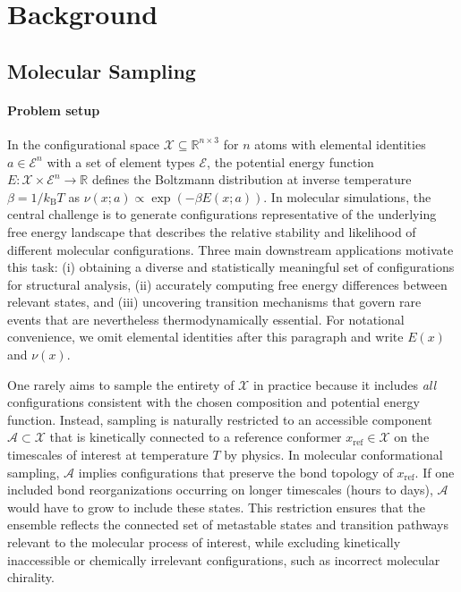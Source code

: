 \documentclass[]{fairmeta}
\theoremstyle{remark}
\begin{document}
\section{Background}

\subsection{Molecular Sampling}
\label{sec:molecular_sampling}

\paragraph{Problem setup}
In the configurational space $\mathcal{X} \subseteq \mathbb{R}^{n \times 3}$ for $n$ atoms with elemental identities $a \in \mathcal{E}^n$ with a set of element types $\mathcal{E}$, the potential energy function $E: \mathcal{X} \times \mathcal{E}^n \to \mathbb{R}$ defines the Boltzmann distribution at inverse temperature $\beta = 1/k_\text{B}T$ as $\nu(x; a) \propto \exp(-\beta E(x; a))$.
In molecular simulations, the central challenge is to generate configurations representative of the underlying free energy landscape that describes the relative stability and likelihood of different molecular configurations.
Three main downstream applications motivate this task: (i) obtaining a diverse and statistically meaningful set of configurations for structural analysis, (ii) accurately computing free energy differences between relevant states, and (iii) uncovering transition mechanisms that govern rare events that are nevertheless thermodynamically essential.
For notational convenience, we omit elemental identities after this paragraph and write $E(x)$ and $\nu(x)$.

One rarely aims to sample the entirety of $\mathcal{X}$ in practice because it includes \emph{all} configurations consistent with the chosen composition and potential energy function.
Instead, sampling is naturally restricted to an accessible component $\mathcal{A} \subset \mathcal{X}$ that is kinetically connected to a reference conformer $x_\text{ref} \in \mathcal{X}$ on the timescales of interest at temperature $T$ by physics.
In molecular conformational sampling, $\mathcal{A}$ implies configurations that preserve the bond topology of $x_\text{ref}$. If one included bond reorganizations occurring on longer timescales (hours to days), $\mathcal{A}$ would have to grow to include these states.
This restriction ensures that the ensemble reflects the connected set of metastable states and transition pathways relevant to the molecular process of interest, while excluding kinetically inaccessible or chemically irrelevant configurations, such as incorrect molecular chirality.
\end{document}
